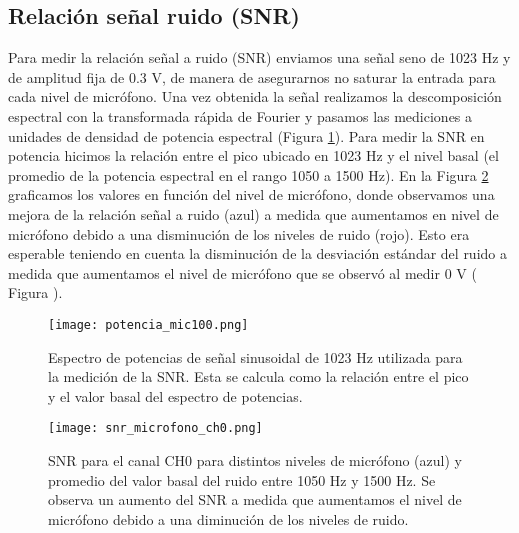\documentclass[a4paper, 11pt]{article}
\begin{document}
\subsection*{Relación señal ruido (SNR)}
Para medir la relación señal a ruido (SNR) enviamos una señal seno de 1023 Hz y de amplitud fija de 0.3 V, de manera de asegurarnos no saturar la entrada para cada nivel de micrófono. Una vez obtenida la señal realizamos la descomposición espectral con la transformada rápida de Fourier y pasamos las mediciones a unidades de densidad de potencia espectral (Figura \ref{fig:potencia_mic100}). Para medir la SNR en potencia hicimos la relación entre el pico ubicado en 1023 Hz y el nivel basal (el promedio de la potencia espectral en el rango 1050 a 1500 Hz). En la Figura \ref{fig:snr} graficamos los valores en función del nivel de micrófono, donde observamos una mejora de la relación señal a ruido (azul) a medida que aumentamos en nivel de micrófono debido a una disminución de los niveles de ruido (rojo). Esto era esperable teniendo en cuenta la disminución de la desviación estándar del ruido a medida que aumentamos el nivel de micrófono que se observó al medir 0 V ( Figura \label{fig:ruidomic}).

\begin{figure} [H]
\centering
\texttt{[image: potencia\_mic100.png]}
\caption{Espectro de potencias de señal sinusoidal de 1023 Hz utilizada para la medición de la SNR. Esta se calcula como la relación entre el pico y el valor basal del espectro de potencias. \label{fig:potencia_mic100}}
\end{figure} 

\begin{figure} [H]
\centering
\texttt{[image: snr\_microfono\_ch0.png]}
\caption{SNR para el canal CH0 para distintos niveles de micrófono (azul) y promedio del valor basal del ruido entre 1050 Hz y 1500 Hz. Se observa un aumento del SNR a medida que aumentamos el nivel de micrófono debido a una diminución de los niveles de ruido. \label{fig:snr}}
\end{figure} 
\end{document}
